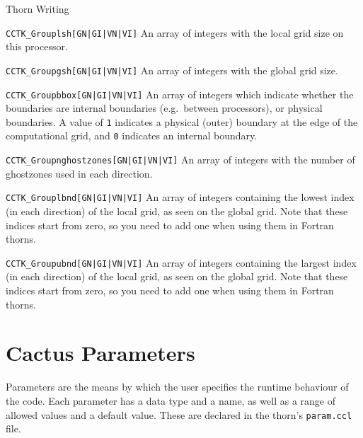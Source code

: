 \begin{cactuspart}{Thorn Writing}
\begin{Lentry}
\item [\texttt{CCTK\_Grouplsh[GN|GI|VN|VI]}]    An array of integers
      with the local grid size on this processor.

\item [\texttt{CCTK\_Groupgsh[GN|GI|VN|VI]}]    An array of integers
      with the global grid size.

\item [\texttt{CCTK\_Groupbbox[GN|GI|VN|VI]}]      An array of  integers
      which indicate whether the boundaries are internal boundaries
      (e.g.\ between processors), or physical boundaries.
        A value of \texttt{1} indicates
      a physical (outer) boundary at the edge of the computational grid,
      and \texttt{0} indicates an internal boundary.

\item [\texttt{CCTK\_Groupnghostzones[GN|GI|VN|VI]}]    An array of integers with
         the number of ghostzones used in each direction.

\item [\texttt{CCTK\_Grouplbnd[GN|GI|VN|VI]}]       An array of integers
      containing the lowest index (in each direction)
      of the local grid, as seen on the global grid. Note that these indices
      start from zero, so you need to add one when using them in
      Fortran thorns.

\item [\texttt{CCTK\_Groupubnd[GN|GI|VN|VI]}]       An array of integers
      containing the largest index (in each direction)
      of the local grid, as seen on the global grid. Note that these indices
      start from zero, so you need to add one when using them in
      Fortran thorns.

\end{Lentry}


\section{Cactus Parameters}
\label{chap:Cactus_parameters}

Parameters are the means by which the user specifies the runtime behaviour of
the code.  Each parameter has a data type and a name, as well as a
range of allowed values and a default value.  These are declared in the thorn's
\texttt{param.ccl} file.


\end{cactuspart}
